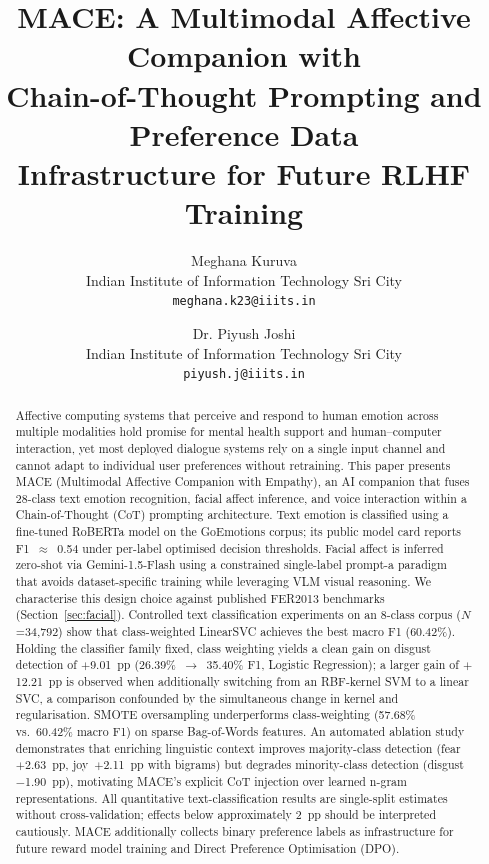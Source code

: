 \documentclass[conference]{IEEEtran}
\begin{document}
\title{MACE: A Multimodal Affective Companion with\\
Chain-of-Thought Prompting and Preference Data\\
Infrastructure for Future RLHF Training}


\author{
Meghana Kuruva\\
Indian Institute of Information Technology Sri City\\
{\tt\small meghana.k23@iiits.in}
\and
Dr. Piyush Joshi\\
Indian Institute of Information Technology Sri City\\
{\tt\small piyush.j@iiits.in}
}

\maketitle

\begin{abstract}
Affective computing systems that perceive and respond to human
emotion across multiple modalities hold promise for mental health
support and human--computer interaction, yet most deployed
dialogue systems rely on a single input channel and cannot adapt
to individual user preferences without retraining.
This paper presents MACE (Multimodal Affective Companion with
Empathy), an AI companion that fuses 28-class text emotion
recognition, facial affect inference, and voice interaction within
a Chain-of-Thought (CoT) prompting architecture.
Text emotion is classified using a fine-tuned RoBERTa model on
the GoEmotions corpus; its public model card reports
F1~$\approx$~0.54 under per-label optimised decision thresholds.
Facial affect is inferred zero-shot via Gemini-1.5-Flash using a
constrained single-label prompt-a paradigm that avoids
dataset-specific training while leveraging VLM visual reasoning.
We characterise this design choice against published FER2013
benchmarks (Section~\ref{sec:facial}).
Controlled text classification experiments on an 8-class corpus
($N$=34,792) show that class-weighted LinearSVC achieves the
best macro F1 (60.42\%).
Holding the classifier family fixed, class weighting yields a
clean gain on disgust detection of $+$9.01~pp (26.39\%~$\to$~35.40\%
F1, Logistic Regression); a larger gain of $+$12.21~pp is observed
when additionally switching from an RBF-kernel SVM to a linear
SVC, a comparison confounded by the simultaneous change in kernel
and regularisation.
SMOTE oversampling underperforms class-weighting (57.68\%
vs.\ 60.42\% macro F1) on sparse Bag-of-Words features.
An automated ablation study demonstrates that enriching
linguistic context improves majority-class detection
(fear~$+$2.63~pp, joy~$+$2.11~pp with bigrams) but degrades
minority-class detection (disgust~$-$1.90~pp), motivating MACE's
explicit CoT injection over learned n-gram representations.
All quantitative text-classification results are single-split
estimates without cross-validation; effects below approximately
2~pp should be interpreted cautiously.
MACE additionally collects binary preference labels as
infrastructure for future reward model training and
Direct Preference Optimisation (DPO).
\end{abstract}
\end{document}
